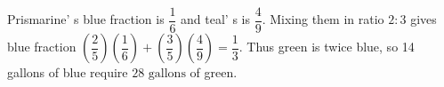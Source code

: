 Prismarine' s blue fraction is $\dfrac{1}{6}$ and teal' s is $\dfrac{4}{9}$. Mixing them in ratio $2:3$ gives blue fraction $(\dfrac{2}{5})(\dfrac{1}{6})+(\dfrac{3}{5})(\dfrac{4}{9})=\dfrac{1}{3}$. Thus green is twice blue, so 14 gallons of blue require $\boxed{28\text{ gallons}}$ of green.
